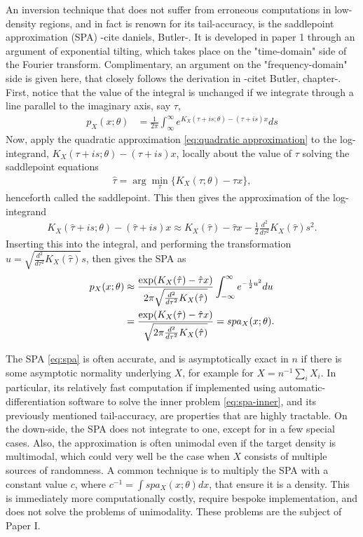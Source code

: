 An inversion technique that does not suffer from erroneous computations in low-density regions, and in fact is renown for its tail-accuracy, is the saddlepoint approximation (SPA) -cite daniels, Butler-.
It is developed in paper 1 through an argument of exponential tilting, which takes place on the "time-domain" side of the Fourier transform. 
Complimentary, an argument on the "frequency-domain" side is given here, that closely follows the derivation in -citet Butler, chapter-.
First, notice that the value of the integral is unchanged if we integrate through a line parallel to the imaginary axis, say $\tau$,
\begin{align}
	p_X(x;\theta) 
	&= \frac{1}{2\pi} \int_{\infty}^{\infty} e^{K_X(\tau+is;\theta)-(\tau+is)x} ds
\end{align}
Now, apply the quadratic approximation \eqref{eq:quadratic approximation} to the log-integrand,
$K_X(\tau+is;\theta)-(\tau+is)x$,
locally about the value of $\tau$ solving the saddlepoint equations
\begin{align}\label{eq:spa-inner}
	\hat{\tau}=\arg\min_\tau\{ K_X(\tau;\theta)-\tau x\},
\end{align}
henceforth called the saddlepoint.
This then gives the approximation of the log-integrand
\begin{align}
	K_X(\hat{\tau}+is;\theta)-(\hat{\tau}+is)x
	\approx 
	K_X(\hat{\tau})-\hat{\tau}x
	- \frac{1}{2}\frac{d^2}{d\tau^2}K_X(\hat{\tau})s^2.
\end{align}
Inserting this into the integral, and performing the transformation $u=\sqrt{\frac{d^2}{d\tau^2}K_X(\hat{\tau})}s$, then gives the SPA as
\begin{align}\label{eq:spa}
	p_X(x;\theta) 
	&\approx
	\frac{\exp(K_X(\hat{\tau})-\hat{\tau}x)}{2\pi\sqrt{\frac{d^2}{d\tau^2}K_X(\hat{\tau})}}
	\int_{-\infty}^{\infty}e^{-\frac{1}{2}u^2}du \notag \\
	&= \frac{\exp(K_X(\hat{\tau})-\hat{\tau}x)}{\sqrt{2\pi\frac{d^2}{d\tau^2}K_X(\hat{\tau})}}
	= spa_X(x;\theta).
\end{align}

The SPA \eqref{eq:spa} is often accurate, and is asymptotically exact in $n$ if there is some asymptotic normality underlying $X$, for example for $X=n^{-1}\sum_i X_i$.
In particular, its relatively fast computation if implemented using automatic-differentiation software to solve the inner problem \eqref{eq:spa-inner}, and its previously mentioned tail-accuracy, are properties that are highly tractable.
On the down-side, the SPA does not integrate to one, except for in a few special cases.
Also, the approximation is often unimodal even if the target density is multimodal, which could very well be the case when $X$ consists of multiple sources of randomness.
A common technique is to multiply the SPA with a constant value $c$, where $c^{-1}=\int spa_X(x;\theta)dx$, that ensure it is a density.
This is immediately more computationally costly, require bespoke implementation, and does not solve the problems of unimodality. 
These problems are the subject of Paper I.

